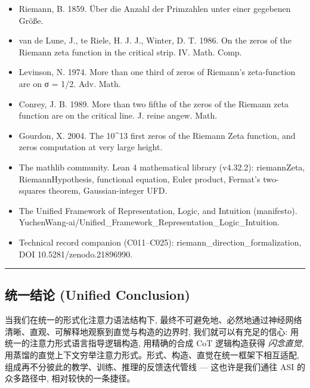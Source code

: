 \documentclass[
]{article}
\providecommand{\tightlist}{%
  \setlength{\itemsep}{0pt}\setlength{\parskip}{0pt}}
\begin{document}
\begin{itemize}
\tightlist
\item
  Riemann, B. 1859. Über die Anzahl der Primzahlen unter einer gegebenen
  Größe.
\item
  van de Lune, J., te Riele, H. J. J., Winter, D. T. 1986. On the zeros
  of the Riemann zeta function in the critical strip. IV. Math. Comp.
\item
  Levinson, N. 1974. More than one third of zeros of Riemann's
  zeta-function are on σ = 1/2. Adv. Math.
\item
  Conrey, J. B. 1989. More than two fifths of the zeros of the Riemann
  zeta function are on the critical line. J. reine angew. Math.
\item
  Gourdon, X. 2004. The 10\^{}13 first zeros of the Riemann Zeta
  function, and zeros computation at very large height.
\item
  The mathlib community. Lean 4 mathematical library (v4.32.2):
  riemannZeta, RiemannHypothesis, functional equation, Euler product,
  Fermat's two-squares theorem, Gaussian-integer UFD.
\item
  The Unified Framework of Representation, Logic, and Intuition
  (manifesto).
  YuchenWang-ai/Unified\_Framework\_Representation\_Logic\_Intuition.
\item
  Technical record companion (C011--C025):
  riemann\_direction\_formalization, DOI 10.5281/zenodo.21896990.
\end{itemize}

\begin{center}\rule{0.5\linewidth}{0.5pt}\end{center}

\subsection{统一结论 (Unified
Conclusion)}\label{ux7edfux4e00ux7ed3ux8bba-unified-conclusion}

当我们在统一的形式化注意力语法结构下,
最终不可避免地、必然地通过神经网络清晰、直观、可解释地观察到直觉与构造的边界时,
我们就可以有充足的信心: 用统一的注意力形式语言指导逻辑构造, 用精确的合成
CoT 逻辑构造获得 \emph{闪念直觉},
用蒸馏的直觉上下文穷举注意力形式。形式、构造、直觉在统一框架下相互适配,
组成再不分彼此的教学、训练、推理的反馈迭代管线 --- 这也许是我们通往 ASI
的众多路径中, 相对较快的一条捷径。
\end{document}
